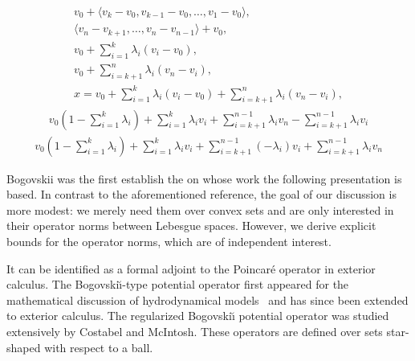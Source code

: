\documentclass[a4paper]{article}
\begin{document}
\begin{align}
        v_0 + \langle v_k - v_0, v_{k-1} - v_0, \dots, v_1 - v_0 \rangle,
        \\
        \langle v_n - v_{k+1}, \dots, v_n - v_{n-1} \rangle + v_{0},
        \\
        v_0 + \sum_{i=1}^{k} \lambda_{i} ( v_i - v_0 ),
        \\
        v_0 + \sum_{i=k+1}^{n} \lambda_{i} ( v_n - v_i ),
        \\
        x = v_0 + \sum_{i=1}^{k} \lambda_{i} ( v_i - v_0 ) + \sum_{i=k+1}^{n} \lambda_{i} ( v_n - v_i ),
    \end{align}
    \begin{align}
        v_0 \left( 1 - \sum_{i=1}^{k} \lambda_{i} \right)
        +
        \sum_{i=1}^{k} \lambda_{i} v_i 
        +
        \sum_{i=k+1}^{n-1} \lambda_{i} v_n
        -
        \sum_{i=k+1}^{n-1} \lambda_{i} v_i
    \end{align}
    \begin{align}
        v_0 \left( 1 - \sum_{i=1}^{k} \lambda_{i} \right)
        +
        \sum_{i=1}^{k} \lambda_{i} v_i 
        +
        \sum_{i=k+1}^{n-1} (-\lambda_{i}) v_i
        +
        \sum_{i=k+1}^{n-1} \lambda_{i} v_n
    \end{align}


    
    
    
    
    
    
    
    
    
    
    
    
    
    
    
    
    
    
    
    
    
    
    
    
    Bogovskii was the first establish the 
    on whose work the following presentation is based. 
    In contrast to the aforementioned reference, the goal of our discussion is more modest:
    we merely need them over convex sets and are only interested in their operator norms between Lebesgue spaces.
    However, we derive explicit bounds for the operator norms, which are of independent interest. 
    
    It can be identified as a formal adjoint to the Poincar\'e operator in exterior calculus. 
    The Bogovski\u{\i}-type potential operator first appeared for the mathematical discussion of hydrodynamical models~\cite{bogovskii1979solution} and has since been extended to exterior calculus. 
    The regularized Bogovski\u{\i} potential operator was studied extensively by Costabel and McIntosh.
    These operators are defined over sets star-shaped with respect to a ball. 
    
\end{document}
